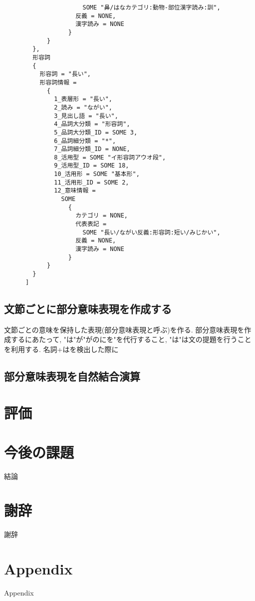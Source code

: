 \documentclass{jreport}
\begin{document}
\begin{verbatim}
                      SOME "鼻/はなカテゴリ:動物-部位漢字読み:訓",
                    反義 = NONE,
                    漢字読み = NONE
                  }
            }
        },
        形容詞
        {
          形容詞 = "長い",
          形容詞情報 =
            {
              1_表層形 = "長い",
              2_読み = "ながい",
              3_見出し語 = "長い",
              4_品詞大分類 = "形容詞",
              5_品詞大分類_ID = SOME 3,
              6_品詞細分類 = "*",
              7_品詞細分類_ID = NONE,
              8_活用型 = SOME "イ形容詞アウオ段",
              9_活用型_ID = SOME 18,
              10_活用形 = SOME "基本形",
              11_活用形_ID = SOME 2,
              12_意味情報 =
                SOME
                  {
                    カテゴリ = NONE,
                    代表表記 =
                      SOME "長い/ながい反義:形容詞:短い/みじかい",
                    反義 = NONE,
                    漢字読み = NONE
                  }
            }
        }
      ]
\end{verbatim}


\section{文節ごとに部分意味表現を作成する}
文節ごとの意味を保持した表現(部分意味表現と呼ぶ)を作る. 部分意味表現を作成するにあたって, 
"は"が"がのにを"を代行すること, "は"は文の提題を行うことを利用する. 名詞+はを検出した際に

\section{部分意味表現を自然結合演算}


\chapter{評価}

\chapter{今後の課題}
結論

\chapter*{謝辞}
{謝辞}

\appendix
\chapter{Appendix}
Appendix
\end{document}
